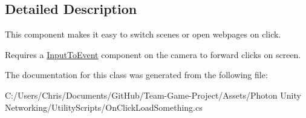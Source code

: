 \subsection{Detailed Description}
This component makes it easy to switch scenes or open webpages on click. 

Requires a \hyperlink{class_input_to_event}{Input\+To\+Event} component on the camera to forward clicks on screen. 

The documentation for this class was generated from the following file\+:\begin{DoxyCompactItemize}
\item 
C\+:/\+Users/\+Chris/\+Documents/\+Git\+Hub/\+Team-\/\+Game-\/\+Project/\+Assets/\+Photon Unity Networking/\+Utility\+Scripts/On\+Click\+Load\+Something.\+cs\end{DoxyCompactItemize}
